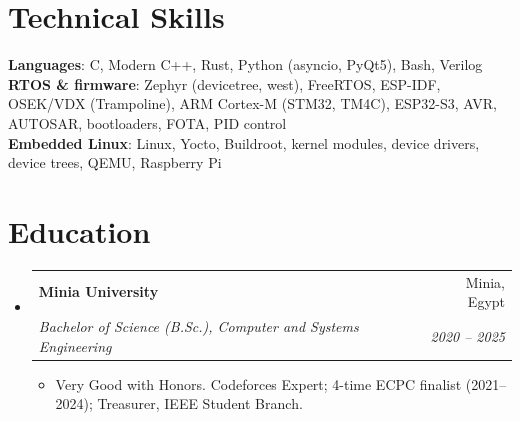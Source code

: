 \documentclass[letterpaper,11pt]{article}
\makeatletter
\newcommand{\resumeItem}[1]{
  \item\small{
    {#1 \vspace{-2pt}}
  }
}
\newcommand{\resumeSubheading}[4]{
  \vspace{-2pt}\item
    \begin{tabular*}{0.97\textwidth}[t]{l@{\extracolsep{\fill}}r}
      \textbf{#1} & #2 \\
      \textit{\small#3} & \textit{\small #4} \\
    \end{tabular*}\vspace{-7pt}
}
\newcommand{\resumeSubHeadingListStart}{\begin{itemize}[leftmargin=0.15in, label={}]}
\newcommand{\resumeSubHeadingListEnd}{\end{itemize}}
\newcommand{\resumeItemListStart}{\begin{itemize}}
\newcommand{\resumeItemListEnd}{\end{itemize}\vspace{-5pt}}
\makeatother
\begin{document}
%
\section{Technical Skills}
 \begin{itemize}[leftmargin=0.15in, label={}]
    \small{\item{
     \textbf{Languages}{: C, Modern C++, Rust, Python (asyncio, PyQt5), Bash, Verilog} \\
     \textbf{RTOS \& firmware}{: Zephyr (devicetree, west), FreeRTOS, ESP-IDF, OSEK/VDX (Trampoline), ARM Cortex-M (STM32, TM4C), ESP32-S3, AVR, AUTOSAR, bootloaders, FOTA, PID control} \\
     \textbf{Embedded Linux}{: Linux, Yocto, Buildroot, kernel modules, device drivers, device trees, QEMU, Raspberry Pi}
    }}
 \end{itemize}

\section{Education}
  \resumeSubHeadingListStart
    \resumeSubheading
      {Minia University}{Minia, Egypt}
      {Bachelor of Science (B.Sc.), Computer and Systems Engineering}{2020 -- 2025}
      \resumeItemListStart
        \resumeItem{Very Good with Honors. Codeforces Expert; 4-time ECPC finalist (2021--2024); Treasurer, IEEE Student Branch.}
      \resumeItemListEnd
  \resumeSubHeadingListEnd


\end{document}
